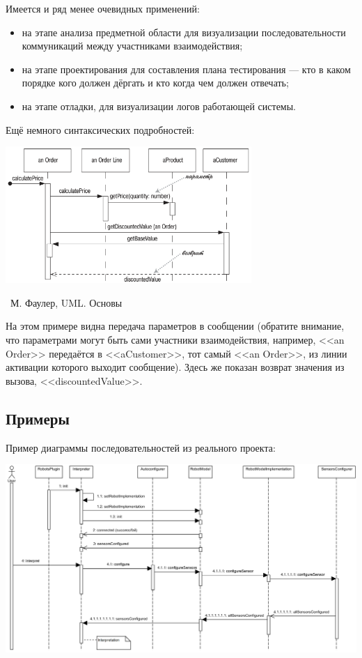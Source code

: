 \documentclass[a5paper]{article}
\newcommand{\attribution}[1] {
    \vspace{-5mm}\begin{flushright}\begin{scriptsize}%
    {\textcopyright\, #1}\end{scriptsize}\end{flushright}
}
\begin{document}
Имеется и ряд менее очевидных применений: 

\begin{itemize}
    \item на этапе анализа предметной области для визуализации последовательности коммуникаций между участниками взаимодействия;
    \item на этапе проектирования для составления плана тестирования --- кто в каком порядке кого должен дёргать и кто когда чем должен отвечать;
    \item на этапе отладки, для визуализации логов работающей системы.
\end{itemize}

Ещё немного синтаксических подробностей:

\begin{center}
    \includegraphics[width=0.7\textwidth]{sequenceDiagramSyntax2.png}
    \attribution{М. Фаулер, UML. Основы}
\end{center}

На этом примере видна передача параметров в сообщении (обратите внимание, что параметрами могут быть сами участники взаимодействия, например, <<an Order>> передаётся в <<aCustomer>>, тот самый <<an Order>>, из линии активации которого выходит сообщение). Здесь же показан возврат значения из вызова, <<discountedValue>>.

\subsection{Примеры}

Пример диаграммы последовательностей из реального проекта:

\begin{center}
    \includegraphics[width=\textwidth]{sequenceDiagramExample.png}
\end{center}
\end{document}
